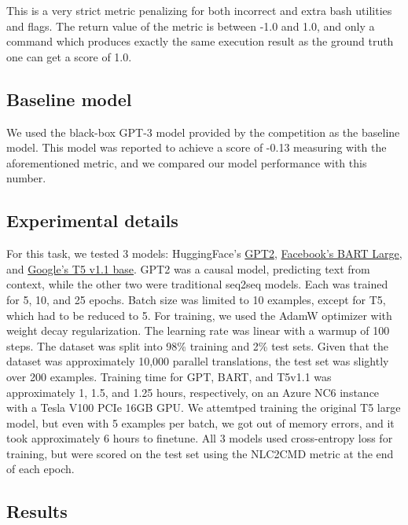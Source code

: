 \documentclass{article}
\begin{document}
This is a very strict metric penalizing for both incorrect and extra bash utilities and flags. The return value of the metric is between -1.0 and 1.0, and only a command which produces exactly the same execution result as the ground truth one can get a score of 1.0.

\subsection{Baseline model}
We used the black-box GPT-3 model provided by the competition as the baseline model. This model was reported to achieve a score of -0.13 measuring with the aforementioned metric, and we compared our model performance with this number.

\color{red}
\subsection{Experimental details}
\color{black}
For this task, we tested 3 models: HuggingFace's
\href{https://huggingface.co/gpt2}{GPT2}\cite{gpt2},
\href{https://huggingface.co/facebook/bart-large}{Facebook's BART
	Large}\cite{bart}, and \href{https://huggingface.co/google/t5-v1_1-base}{Google's T5 v1.1
	base}. GPT2 was a causal model, predicting text from context, while the other
two were traditional seq2seq models. Each was trained for 5, 10, and 25
epochs. Batch size was limited to 10 examples, except for T5, which had to be
reduced to 5. For training, we used the AdamW optimizer with weight decay
regularization. The learning rate was linear with a warmup of 100 steps. The
dataset was split into 98\% training and 2\% test sets. Given that the
dataset was approximately 10,000 parallel translations, the test set was
slightly over 200 examples. Training time for GPT, BART, and T5v1.1 was
approximately 1, 1.5, and 1.25 hours, respectively, on an Azure NC6 instance
with a Tesla V100 PCIe 16GB GPU. We attemtped training the original T5 large
model, but even with 5 examples per batch, we got out of memory errors, and
it took approximately 6 hours to finetune. All 3 models used cross-entropy
loss for training, but were scored on the test set using the NLC2CMD metric
at the end of each epoch.

\color{red}
\subsection{Results}
\color{black}
\end{document}
